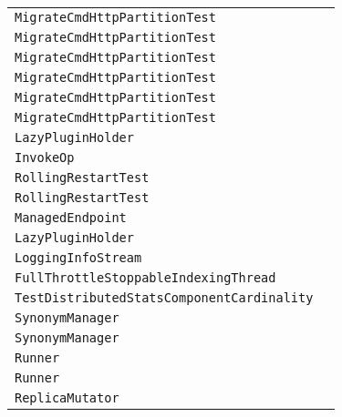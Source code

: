 \begin{center}
\begin{tabular}{ll}
\lstinline/MigrateCmdHttpPartitionTest/&\raisebox{0pt}{\lstinline/migrateKey(ClusterState)/}\\
\lstinline/MigrateCmdHttpPartitionTest/&\raisebox{0pt}{\lstinline/migrateKey(ClusterState)/}\\
\lstinline/MigrateCmdHttpPartitionTest/&\raisebox{0pt}{\lstinline/migrateKey(ClusterState)/}\\
\lstinline/MigrateCmdHttpPartitionTest/&\raisebox{0pt}{\lstinline/migrateKey(ClusterState)/}\\
\lstinline/MigrateCmdHttpPartitionTest/&\raisebox{0pt}{\lstinline/migrateKey(ClusterState)/}\\
\lstinline/MigrateCmdHttpPartitionTest/&\raisebox{0pt}{\lstinline/migrateKey(ClusterState)/}\\
\lstinline/LazyPluginHolder/&\raisebox{0pt}{\lstinline/createInst()/}\\
\lstinline/InvokeOp/&\raisebox{0pt}{\lstinline/Map<String,Object>invokeAClass(SolrQueryRequestreq,Stringc)/}\\
\lstinline/RollingRestartTest/&\raisebox{0pt}{\lstinline/waitUntilOverseerDesignateIsLeader()/}\\
\lstinline/RollingRestartTest/&\raisebox{0pt}{\lstinline/waitUntilOverseerDesignateIsLeader()/}\\
\lstinline/ManagedEndpoint/&\raisebox{0pt}{\lstinline/ObjectparseJsonFromRequestBody()/}\\
\lstinline/LazyPluginHolder/&\raisebox{0pt}{\lstinline/createInst()/}\\
\lstinline/LoggingInfoStream/&\raisebox{0pt}{\lstinline/message(Stringcomponent,String)/}\\
\lstinline/FullThrottleStoppableIndexingThread/&\raisebox{0pt}{\lstinline/run()/}\\
\lstinline/TestDistributedStatsComponentCardinality/&\raisebox{0pt}{\lstinline/buildIndex()/}\\
\lstinline/SynonymManager/&\raisebox{0pt}{\lstinline/doDeleteChild(BaseSolrResourcepoint,StringchildId)/}\\
\lstinline/SynonymManager/&\raisebox{0pt}{\lstinline/doDeleteChild(BaseSolrResourcepoint,StringchildId)/}\\
\lstinline/Runner/&\raisebox{0pt}{\lstinline/resetTaskWithException()/}\\
\lstinline/Runner/&\raisebox{0pt}{\lstinline/resetTaskWithException()/}\\
\lstinline/ReplicaMutator/&\raisebox{0pt}{\lstinline/DocCollectioncheckAndCompleteShardSplit()/}\\

\end{tabular}
\end{center}
